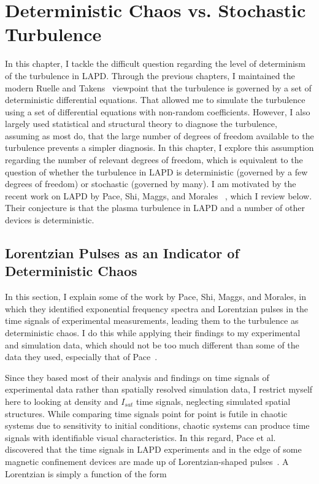 \chapter{Deterministic Chaos vs. Stochastic Turbulence}
\label{c_chaos}

In this chapter, I tackle the difficult question regarding the level of determinism of the turbulence in LAPD. Through the previous chapters, I maintained the modern 
Ruelle and Takens~\cite{ruelle1971} viewpoint that the turbulence is governed by a set of deterministic differential equations. That allowed me to simulate the turbulence using a set of differential
equations with non-random coefficients. However, I also largely used statistical and structural theory to diagnose the turbulence, assuming as most do, that the large number of degrees of freedom
available to the turbulence prevents a simpler diagnosis.
In this chapter, I explore this assumption regarding the number of relevant degrees of freedom, which is equivalent to the question of whether the turbulence in LAPD is deterministic
(governed by a few degrees of freedom) or stochastic (governed by many).
I am motivated by the recent work on LAPD by Pace, Shi, Maggs, and Morales
~\cite{pace2008a,pace2008b,shi2009,maggs2011,maggs2012a,maggs2012b,maggs2013}, which I review below. Their conjecture is that the plasma turbulence in LAPD and a number of other devices is deterministic.

\section{Lorentzian Pulses as an Indicator of Deterministic Chaos}
\label{s_lorentzian_pulses}

In this section, I explain some of the work by Pace, Shi, Maggs, and Morales, in which they identified exponential frequency spectra and 
Lorentzian pulses in the time signals of experimental measurements, leading them to the turbulence as deterministic chaos.
I do this while applying their findings to my experimental and simulation data, which should not be too much different than some of the data they used, especially that of Pace~\cite{pace2008a,pace2008b}.

Since they based most of their analysis and findings on time signals of experimental data rather than spatially resolved simulation data, 
I restrict myself here to looking at density and $I_{sat}$ time signals, neglecting simulated spatial structures.
While comparing time signals point for point is futile in chaotic systems due to sensitivity to initial conditions,
chaotic systems can produce time signals with identifiable visual characteristics.
In this regard, Pace et al. discovered that the time signals in LAPD experiments and in the edge of some magnetic confinement devices
are made up of Lorentzian-shaped pulses~\cite{pace2008a,pace2008b}. A Lorentzian is simply a function of the form

